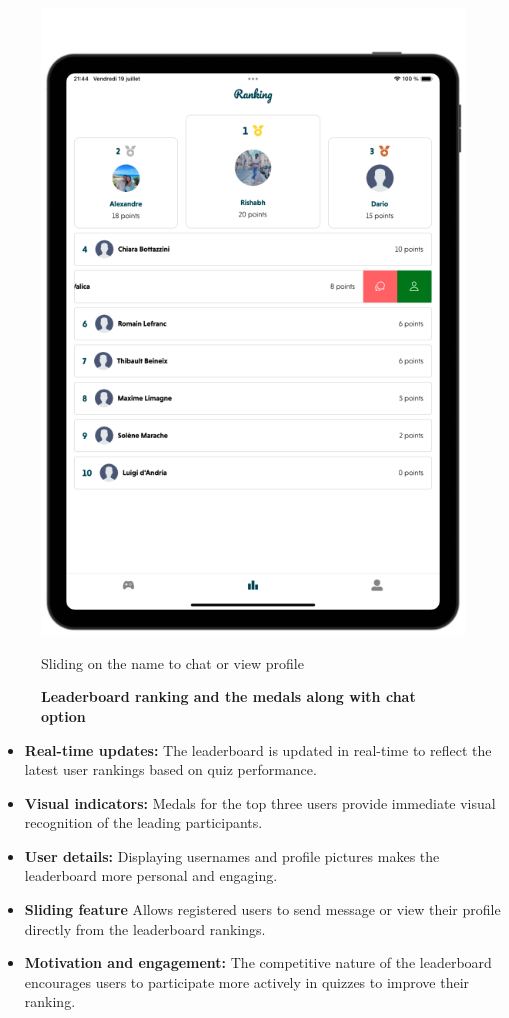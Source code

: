 \begin{figure}[H]
\begin{minipage}[b]{0.43\linewidth}
        \includegraphics[width=\linewidth]{TabletUI/Sliding on the name to chat or view profile.png}
        \caption{Sliding on the name to chat or view profile}
    \end{minipage}
    \caption{\textbf{Leaderboard ranking and the medals along with chat option}}
\end{figure}


\begin{itemize}
\item \textbf{Real-time updates:} The leaderboard is updated in real-time to reflect the latest user rankings based on quiz performance.
\item \textbf{Visual indicators:} Medals for the top three users provide immediate visual recognition of the leading participants.
\item \textbf{User details:} Displaying usernames and profile pictures makes the leaderboard more personal and engaging.
\item \textbf{Sliding feature} Allows registered users to send message or view their profile directly from the leaderboard rankings.
\item \textbf{Motivation and engagement:} The competitive nature of the leaderboard encourages users to participate more actively in quizzes to improve their ranking.
\end{itemize}

